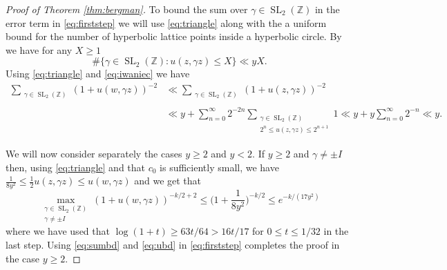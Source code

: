 \documentclass[12pt, a4paper]{amsart}
\newcommand{\tmop}[1]{\ensuremath{\operatorname{#1}}}
\theoremstyle{definition}
\newcommand {\1} {\mathbf{1}}
\numberwithin{equation}{section}
\begin{document}
\begin{proof}[Proof of Theorem \ref{thm:bergman}]
To bound the sum over $\gamma \in \tmop{SL}_2(\mathbb Z)$ in the error term in \eqref{eq:firststep} we will use \eqref{eq:triangle} along with the a uniform bound for the number of hyperbolic lattice points inside a hyperbolic circle. By \cite[Corollary 2.12]{Iwaniec-2002} we have for any $X \ge 1$
\begin{equation} \label{eq:iwaniec}
\# \{ \gamma \in \tmop{SL}_2(\mathbb Z) :
u(z,\gamma z) \le X \} \ll y X.
\end{equation}
Using \eqref{eq:triangle} and \eqref{eq:iwaniec} we have
\begin{equation} \label{eq:sumbd}
\begin{split}
\sum_{\substack{\gamma \in
\tmop{SL}_2(\mathbb Z) \\ }} (1+u(w,\gamma z))^{-2} & \ll
\sum_{\substack{\gamma \in
\tmop{SL}_2(\mathbb Z) \\ }} (1+u(z,\gamma z))^{-2} \\
&
\ll y+ \sum_{n=0}^{\infty}  2^{-2n}
\sum_{\substack{\gamma \in
\tmop{SL}_2(\mathbb Z) \\ 2^n \le u(z,\gamma z) \le 2^{n+1}}} 1
\ll y+y \sum_{n=0}^{\infty} 2^{-n} \ll y.
\end{split}
\end{equation}

We will now consider separately the cases $y \ge 2$ and $y < 2$.
If $y \ge 2$ and $\gamma \neq \pm I$ then, using \eqref{eq:triangle} and that $c_0$ is sufficiently small, we have
$\tfrac{1}{8y^2} \le \tfrac12 u(z,\gamma z) \le u(w,\gamma z)$ and we get that
\begin{equation} \label{eq:ubd}
\max_{\substack{\gamma \in \tmop{SL}_2(\mathbb Z) \\ \gamma\neq \pm I}}(1+u(w,\gamma z))^{-k/2+2}
\le \bigg(1+\frac{1}{8y^2} \bigg)^{-k/2} \le e^{-k/(17y^2)}
\end{equation}
where we have used that $\log(1+t) \ge 63t/64 > 16t/17$ for $0\le t \le 1/32$ in the last step. Using \eqref{eq:sumbd} and \eqref{eq:ubd} in \eqref{eq:firststep} completes the proof in the case $y \ge 2$.

\vspace{2mm}


\end{proof}
\end{document}

